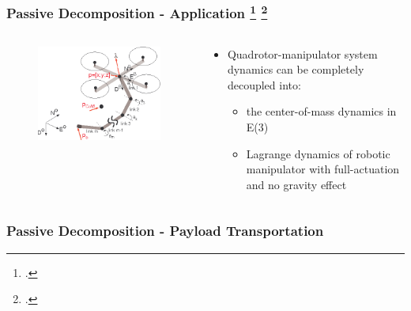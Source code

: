 \begin{frame}
	\frametitle{Passive Decomposition - Application \footcite{passive-decomp-quadrotor-with-robotic-manip}        \footcite{decoupled-aerial-manipulation}}
	
	\begin{columns}
		\begin{column}{0.5\textwidth}\centering
			\begin{figure}[H]
				\includegraphics[width=\columnwidth]{figures/aerial_manip.png}	
				\centering
				\label{fig:aerial_manip}
			\end{figure}
		\end{column}
		
		\begin{column}{0.5\textwidth}\centering
			\begin{itemize}
			\item Quadrotor-manipulator system dynamics can be completely decoupled into:
			\begin{itemize}
				\item the center-of-mass dynamics in E(3)
				\item Lagrange dynamics of robotic manipulator with full-actuation and no gravity effect
			\end{itemize}
			\end{itemize}
		\end{column}
	\end{columns}
 \end{frame}

\begin{frame}
	\frametitle{Passive Decomposition - Payload Transportation}
\end{frame}